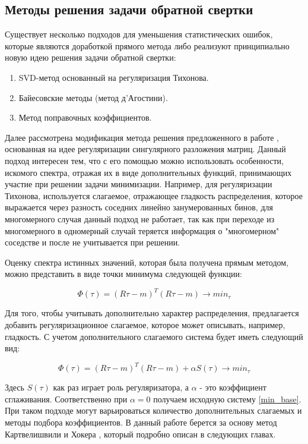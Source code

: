 \documentclass[a4paper,12pt]{diplom}
\begin{document}
\subsection*{Методы решения задачи обратной свертки}

Существует несколько подходов для уменьшения статистических ошибок, которые являются доработкой прямого метода либо реализуют принципиально
новую идею решения задачи обратной свертки:
\begin{enumerate}
\item SVD-метод основанный на регуляризация Тихонова.
\item Байесовские методы (метод д’Агостини).
\item Метод поправочных коэффициентов.
\end{enumerate}

Далее рассмотрена модификация метода решения предложенного в работе \cite{SvdBogomolov}, основанная на идее регуляризации сингулярного разложения 
матриц. Данный подход интересен тем, что с его помощью можно использовать особенности, искомого спектра, отражая их в виде дополнительных функций, 
принимающих участие при решении задачи минимизации. Например, для регуляризации Тихонова, используется слагаемое, отражающее гладкость 
распределения, которое выражается через разность соседних линейно занумерованных бинов, для многомерного случая данный подход не работает, 
так как при переходе из многомерного в одномерный случай теряется информация о "многомерном" соседстве и после не учитывается при решении.

Оценку спектра истинных значений, которая была получена прямым методом, можно представить в виде точки минимума следующей функции: 

\begin{equation}
   \Phi(\tau)=(R\tau-m)^T (R\tau-m) \to min_{\tau}
   \label{min_base}
\end{equation}

Для того, чтобы учитывать дополнительно характер распределения, предлагается добавить регуляризационное слагаемое,  
которое может описывать, например, гладкость. С учетом дополнительного слагаемого система будет иметь следующий вид: 

\begin{equation}
   \Phi(\tau)=(R\tau-m)^T (R\tau-m) + \alpha S(\tau) \to min_{\tau}
   \label{min_svd}
\end{equation}
  
Здесь $S(\tau)$ как раз играет роль регуляризатора, а $\alpha$ - это коэффициент сглаживания. Соответственно при $\alpha = 0$ 
получаем исходную систему \eqref{min_base}. При таком подходе могут варьироваться количество дополнительных слагаемых и 
методы подбора коэффициентов. В данный работе берется за основу метод Картвелишвили и Хокера \cite{SvdHocker}, который подробно описан 
в следующих главах. 
\end{document}
